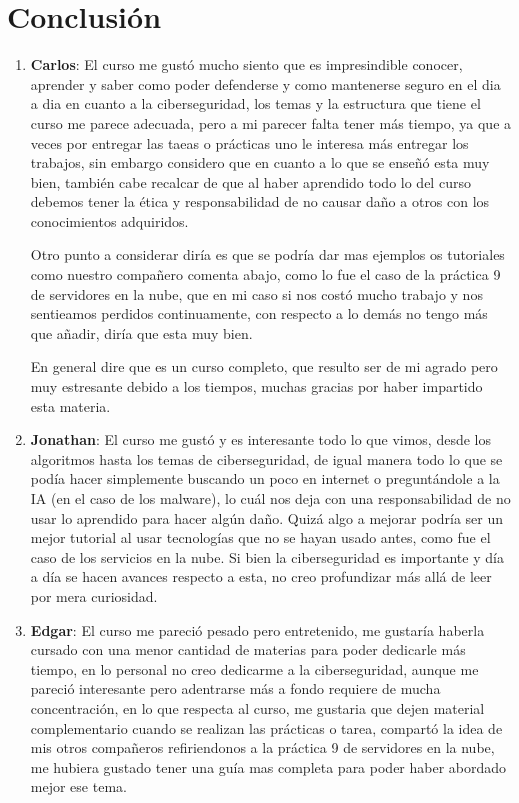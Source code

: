 \documentclass{article}
\begin{document}
\section*{Conclusión}

\begin{enumerate}
    \item \textbf{Carlos}: El curso me gustó mucho siento que es impresindible conocer, aprender y saber como poder defenderse y como mantenerse seguro en el dia a dia en cuanto a la ciberseguridad, los temas y la estructura que tiene el curso me parece adecuada, pero a mi parecer falta tener más tiempo, ya que a veces por entregar las taeas o prácticas uno le interesa más entregar los trabajos, sin embargo considero que en cuanto a lo que se enseñó esta muy bien, también cabe recalcar de que al haber aprendido todo lo del curso debemos tener la ética y responsabilidad de no causar daño a otros con los conocimientos adquiridos.

    Otro punto a considerar diría es que se podría dar mas ejemplos os tutoriales como nuestro compañero comenta abajo, como lo fue el caso de la práctica 9 de servidores en la nube, que en mi caso si nos costó mucho trabajo y nos sentieamos perdidos continuamente, con respecto a lo demás no tengo más que añadir, diría que esta muy bien.

    En general dire que es un curso completo, que resulto ser de mi agrado pero muy estresante debido a los tiempos, muchas gracias por haber impartido esta materia.  

    \item \textbf{Jonathan}: El curso me gustó y es interesante todo lo que vimos, desde los algoritmos hasta los temas de ciberseguridad, de igual manera todo lo que se podía hacer simplemente buscando un poco en internet o preguntándole a la IA (en el caso de los malware), lo cuál nos deja con una responsabilidad de no usar lo aprendido para hacer algún daño. Quizá algo a mejorar podría ser un mejor tutorial al usar tecnologías que no se hayan usado antes, como fue el caso de los servicios en la nube. Si bien la ciberseguridad es importante y día a día se hacen avances respecto a esta, no creo profundizar más allá de leer por mera curiosidad.

    \item \textbf{Edgar}: El curso me pareció pesado pero entretenido, me gustaría haberla cursado con una menor cantidad de materias para poder dedicarle más tiempo, en lo personal no creo dedicarme a la ciberseguridad, aunque me pareció interesante pero adentrarse más a fondo requiere de mucha concentración, en lo que respecta al curso, me gustaria que dejen material complementario cuando se realizan las prácticas o tarea, compartó la idea de mis otros compañeros refiriendonos a la práctica 9 de servidores en la nube, me hubiera gustado tener una guía mas completa para poder haber abordado mejor ese tema.
\end{enumerate}
\end{document}
